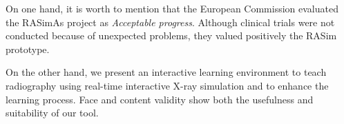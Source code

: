 On one hand, it is worth to mention that the European Commission evaluated the \acs{RASimAs} project as \emph{Acceptable progress}. Although clinical trials were not conducted because of unexpected problems, they valued positively the \acs{RASim} prototype.

On the other hand, we present an interactive learning environment to teach radiography using real-time interactive X-ray simulation and to enhance the learning process. Face and content validity show both the usefulness and suitability of our tool.
\renewcommand{\figurename}{Figura}
